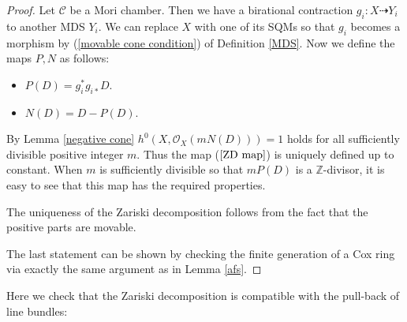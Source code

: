 \documentclass[12pt,twoside]{amsart}
\theoremstyle{definition}
\newcommand\bz{\mathbb{Z}}
\begin{document}
\begin{proof}
Let $\mathcal{C}$ be a Mori chamber. Then we have a birational contraction
$g_i:X\dasharrow Y_i$ to another MDS $Y_i$.
We can replace $X$ with one of its SQMs so that $g_i$ becomes a morphism
by (\ref{movable cone condition}) of Definition \ref{MDS}.
Now we define the maps $P,N$ as follows:
\begin{itemize}
\item $P(D)=g_i^{*}g_{i*}D$.
\item $N(D)=D-P(D)$.
\end{itemize}
By Lemma \ref{negative cone} $h^{0}(X,\mathcal{O}_X(mN(D)))=1$
holds for all sufficiently divisible
positive integer $m$. Thus the map ($\ref{ZD map}$) is uniquely defined up to constant.
When $m$ is sufficiently divisible so that $mP(D)$ is a $\bz$-divisor,
it is easy to see that this map has the required properties.

The uniqueness of the Zariski decomposition follows from the fact that the positive parts are movable.

The last statement can be shown by checking the finite generation of a Cox ring via exactly the
same argument as in Lemma \ref{afs}.

\end{proof}


Here we check that the Zariski decomposition is compatible with the pull-back of
line bundles:
\end{document}
